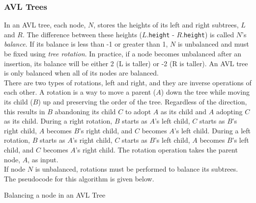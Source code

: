 \subsubsection{AVL Trees}

In an AVL tree, each node, $N$, stores the heights of its left and right subtrees, $L$ and $R$. The difference between these heights ($L$.\texttt{height} - $R$.\texttt{height}) is called $N$'s \textit{balance}. If its balance is less than -1 or greater than 1, $N$ is unbalanced and must be fixed using \textit{tree rotation}. In practice, if a node becomes unbalanced after an insertion, its balance will be either 2 (L is taller) or -2 (R is taller). An AVL tree is only balanced when all of its nodes are balanced. \\

There are two types of rotations, left and right, and they are inverse operations of each other. A rotation is a way to move a parent ($A$) down the tree while moving its child ($B$) up and preserving the order of the tree. Regardless of the direction, this results in $B$ abandoning its child $C$ to adopt $A$ as its child and $A$ adopting $C$ as its child. During a right rotation, $B$ starts as $A$'s left child, $C$ starts as $B$'s right child, $A$ becomes $B$'s right child, and $C$ becomes $A$'s left child. During a left rotation, $B$ starts as $A$'s right child, $C$ starts as $B$'s left child, $A$ becomes $B$'s left child, and $C$ becomes $A$'s right child. The rotation operation takes the parent node, $A$, as input. \\

If node $N$ is unbalanced, rotations must be performed to balance its subtrees. The pseudocode for this algorithm is given below. \\

\begin{algorithm}[H]
    \caption{Balancing a node in an AVL Tree}
\end{algorithm}
\vspace{5mm}

